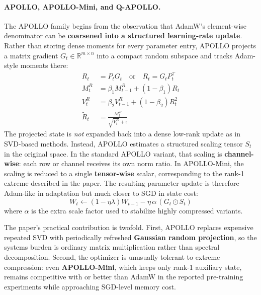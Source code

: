 \paragraph{APOLLO, APOLLO-Mini, and Q-APOLLO.}
The APOLLO family \citep{zhu2025apollosgdlikememoryadamwlevel} begins from the observation that AdamW's element-wise denominator can be \textbf{coarsened into a structured learning-rate update}. Rather than storing dense moments for every parameter entry, APOLLO projects a matrix gradient $G_t \in \mathbb{R}^{m \times n}$ into a compact random subspace and tracks Adam-style moments there:
\begin{align}
R_t &= P_t G_t \quad\text{or}\quad R_t = G_t P_t^\top \\
M_t^R &= \beta_1 M_{t-1}^R + (1-\beta_1)R_t \\
V_t^R &= \beta_2 V_{t-1}^R + (1-\beta_2)R_t^2 \\
\widetilde{R}_t &= \frac{M_t^R}{\sqrt{V_t^R}+\epsilon}
\end{align}
The projected state is \emph{not} expanded back into a dense low-rank update as in SVD-based methods. Instead, APOLLO estimates a structured scaling tensor $S_t$ in the original space. In the standard APOLLO variant, that scaling is \textbf{channel-wise}: each row or channel receives its own norm ratio. In APOLLO-Mini, the scaling is reduced to a single \textbf{tensor-wise} scalar, corresponding to the rank-1 extreme described in the paper. The resulting parameter update is therefore Adam-like in adaptation but much closer to SGD in state cost:
\[
W_t \gets (1-\eta\lambda)W_{t-1} - \eta\,\alpha\,(G_t \odot S_t)
\]
where $\alpha$ is the extra scale factor used to stabilize highly compressed variants.

The paper's practical contribution is twofold. First, APOLLO replaces expensive repeated SVD with periodically refreshed \textbf{Gaussian random projection}, so the systems burden is ordinary matrix multiplication rather than spectral decomposition. Second, the optimizer is unusually tolerant to extreme compression: even \textbf{APOLLO-Mini}, which keeps only rank-1 auxiliary state, remains competitive with or better than AdamW in the reported pre-training experiments while approaching SGD-level memory cost.

